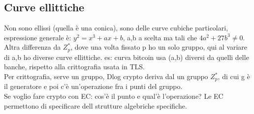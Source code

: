 \documentclass[16px]{article}
\begin{document}
\subsection{Curve ellittiche}
Non sono ellissi (quella è una conica), sono delle curve cubiche particolari, espressione generale è: $y^2 = x^3 +ax + b$, a,b a scelta ma tali che $4a^2 +27b^3 \neq 0$.\\ Altra differenza da $Z_p^*$, dove una volta fissato p ho un solo gruppo, qui al variare di a,b ho diverse curve ellittiche. es: curva bitcoin usa (a,b) diversi da quelli delle banche, rispetto alla crittografia usata in TLS.\\ Per crittografia, serve un gruppo, Dlog crypto deriva dal un gruppo $Z_p^*$, di cui g è il generatore e poi c'è un'operazione fra i punti del gruppo.\\ Se voglio fare crypto con EC: cos'è il punto e qual'è l'operazione? Le EC permettono di specificare dell strutture algebriche specifiche.
\end{document}
